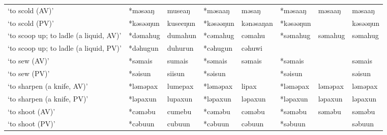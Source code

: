\begin{landscape}
\begin{longtable}[c]{@{}p{3cm}<{\raggedright}p{2.75cm}<{\raggedright}p{2.75cm}<{\raggedright}p{2.75cm}<{\raggedright}p{2.75cm}<{\raggedright}p{2.75cm}<{\raggedright}p{2.75cm}<{\raggedright}p{2.75cm}<{\raggedright}@{}}
`to scold (AV)'                                      & *məsəaŋ            & museaŋ                         & *məsaaŋ            & məsaŋ                      & *məsaaŋ          & məsaaŋ                   & məsaaŋ                            \\
`to scold (PV)'                                      & *kəsəəŋun          & kuseeŋun                       & *kəsəəŋun          & kənəsaŋan                  & *kəsəəŋun        &                          & kəsəəŋun                          \\
`to scoop up; to ladle (a liquid, AV)'               & *dəmahug           & dumahun                        & *cəmahug           & cəmahu                     & *səmahug         & səmahug                  & səmahug                           \\
`to scoop up; to ladle (a liquid, PV)'               & *dəhugun           & duhurun                        & *cəhugun           & cəhuwi                     &                  &                          &                                   \\
`to sew (AV)'                                        & *səmais            & sumais                         & *səmais            & səmais                     & *səmais          &                          & səmais                            \\
`to sew (PV)'                                        & *səisun            & siisun                         & *səisun            &                            & *səisun          &                          & səisun                            \\
`to sharpen (a knife, AV)'                           & *ləməpax           & lumepax                        & *ləməpax           & lipax                      & *ləməpax         & ləməpax                  & ləməpax                           \\
`to sharpen (a knife, PV)'                           & *ləpaxun           & lupaxun                        & *ləpaxun           & ləpaxun                    & *ləpaxun         & ləpaxun                  & ləpaxun                           \\
`to shoot (AV)'                                      & *cəməbu            & cumebu                         & *cəməbu            & cəməbu                     & *səməbu          & səməbu                   & səməbu                            \\
`to shoot (PV)'                                      & *cəbuun            & cubuun                         & *cəbuun            & cəbuun                     & *səbuun          &                          & səbuun                            \\

\end{longtable}
\end{landscape}
